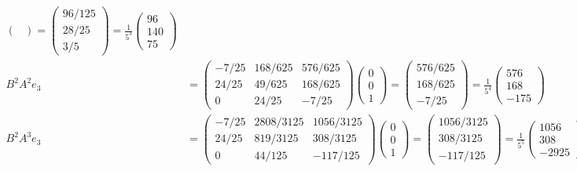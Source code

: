 \documentclass[12pt]{article}
\begin{document}
\begin{align*}
\begin{pmatrix}
            \end{pmatrix} = \begin{pmatrix}
                96/125\\28/25\\3/5
            \end{pmatrix} = \frac{1}{5^3}\begin{pmatrix}
                96\\140\\75
            \end{pmatrix}\\
            B^2A^2e_3 &= \begin{pmatrix}
                -7/25 & 168/625 & 576/625\\
                24/25 & 49/625 & 168/625\\
                0 & 24/25 & -7/25
            \end{pmatrix}\begin{pmatrix}
                0\\0\\1
            \end{pmatrix} = \begin{pmatrix}
                576/625\\168/625\\-7/25
            \end{pmatrix} = \frac{1}{5^4}\begin{pmatrix}
                576\\168\\-175
            \end{pmatrix}\\
            B^2A^3e_3 &= \begin{pmatrix}
                -7/25 & 2808/3125 & 1056/3125\\
                24/25 & 819/3125 & 308/3125\\
                0 & 44/125 & -117/125
            \end{pmatrix}\begin{pmatrix}
                0\\0\\1
            \end{pmatrix} = \begin{pmatrix}
                1056/3125\\308/3125\\-117/125
            \end{pmatrix} = \frac{1}{5^5}\begin{pmatrix}
                1056\\308\\ -2925
            \end{pmatrix}
        \end{align*}
\end{document}
